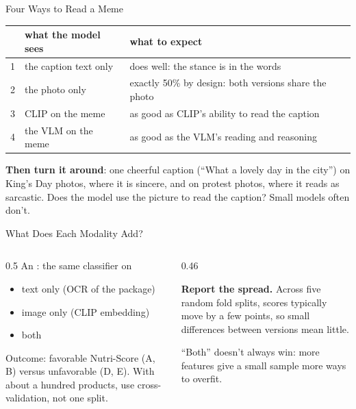 \begin{frame}{Four Ways to Read a Meme}
\vspace{0.1cm}
\centering
{\small
\begin{tabular}{@{}llp{6.2cm}@{}}
\toprule
& what the model sees & what to expect \\
\midrule
1 & the caption text only & does well: the stance is in the words \\
2 & the photo only & exactly 50\% by design: both versions share the photo \\
3 & CLIP on the meme & as good as CLIP's ability to read the caption \\
4 & the VLM on the meme & as good as the VLM's reading and reasoning \\
\bottomrule
\end{tabular}}

\vspace{0.35cm}
\raggedright
\textbf{Then turn it around}: one cheerful caption (``What a lovely day in the city'') on King's Day
photos, where it is sincere, and on protest photos, where it reads as sarcastic. Does the model use
the picture to read the caption? Small models often don't.
\end{frame}

\begin{frame}{What Does Each Modality Add?}
\begin{columns}[T]
\begin{column}{0.5\textwidth}
An : the same classifier on
\begin{itemize}
\item text only (OCR of the package)
\item image only (CLIP embedding)
\item both
\end{itemize}
Outcome: favorable Nutri-Score (A, B) versus unfavorable (D, E). With about a hundred products, use
cross-validation, not one split.
\end{column}
\begin{column}{0.46\textwidth}
\begin{warnbox}
\textbf{Report the spread.} Across five random fold splits, scores typically move by a few points,
so small differences between versions mean little.
\end{warnbox}
\begin{graybox}
``Both'' doesn't always win: more features give a small sample more ways to overfit.
\end{graybox}
\end{column}
\end{columns}
\end{frame}

